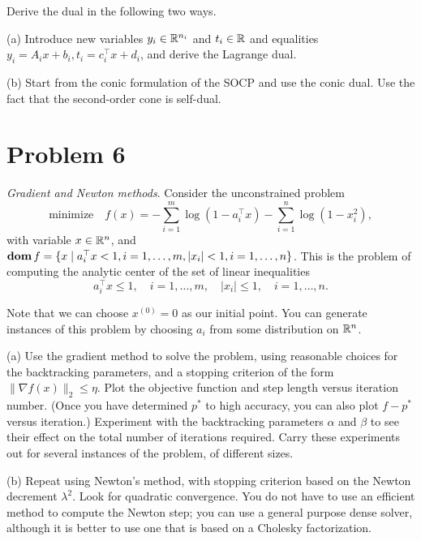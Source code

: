 \documentclass[11pt]{article}
\newcommand{\grad}{\nabla}
\newcommand{\T}{^\top}          %
\begin{document}
Derive the dual in the following two ways.

(a) Introduce new variables $y_i\in{{\mathbb{R}}}^{n_i}$ and $t_i \in {{\mathbb{R}}}$ and equalities $y_i = A_i x + b_i, t_i = c_i\T x + d_i$, and derive the Lagrange dual.

(b) Start from the conic formulation of the SOCP and use the conic dual. Use the fact that the second-order cone is self-dual.



\clearpage
\section*{Problem 6}
\textit{Gradient and Newton methods}. Consider the unconstrained problem
\[
\text{minimize} \quad f(x) = -\sum_{i=1}^{m}\log(1 - a_i\T x) - \sum_{i=1}^{n} \log(1 - x^2_i),
\]
with variable $x\in{{\mathbb{R}}}^n$, and $\dom f=\{x \mid a_i\T x < 1, i = 1, \dots, m, |x_i| < 1, i = 1, \dots, n\}$.
This is the problem of computing the analytic center of the set of linear inequalities
\[
a_i\T x \leq 1, \quad i=1, \dots, m, \quad |x_i| \leq 1, \quad i = 1, \dots, n.
\]

Note that we can choose $x^{(0)} = 0$ as our initial point. You can generate instances of this problem by choosing $a_i$ from some distribution on ${{\mathbb{R}}}^n$.

(a) Use the gradient method to solve the problem, using reasonable choices for the backtracking parameters, and a stopping criterion of the form $\|\grad f(x) \|_2 \leq \eta$. Plot the objective function and step length versus iteration number. (Once you have determined $p^*$ to high accuracy, you can also plot $f - p^*$ versus iteration.) Experiment with the backtracking parameters $\alpha$ and $\beta$ to see their effect on the total number of iterations required. Carry these experiments out for several instances of the problem, of different sizes.

(b) Repeat using Newton's method, with stopping criterion based on the Newton decrement $\lambda^2$. Look for quadratic convergence. You do not have to use an efficient method to compute the Newton step; you can use a general purpose dense solver, although it is better to use one that is based on a Cholesky factorization.
\end{document}
